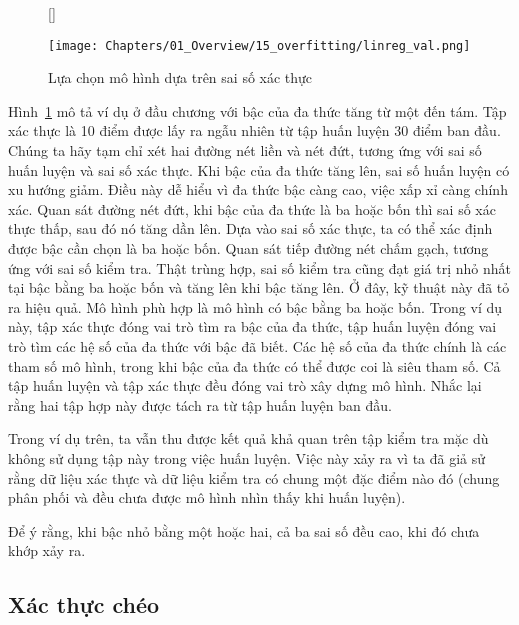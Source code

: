 \begin{figure}[t]
    [\FBwidth]
    {\caption{   
    Lựa chọn mô hình dựa trên sai số xác thực
    }
    \label{fig:15_validerror}}
    { %
    \texttt{[image: Chapters/01\_Overview/15\_overfitting/linreg\_val.png]}
    }
\end{figure}
Hình~\ref{fig:15_validerror} mô tả ví dụ ở đầu chương với bậc của đa thức tăng
từ một đến tám. Tập xác thực là 10 điểm được lấy ra ngẫu nhiên từ tập huấn luyện
30 điểm ban đầu. Chúng ta hãy tạm chỉ xét hai đường nét liền và nét đứt, tương
ứng với {sai số huấn luyện} và {sai số xác thực}. Khi bậc của đa thức tăng lên,
{sai số huấn luyện} có xu hướng giảm. Điều này dễ hiểu vì đa thức bậc càng cao,
việc xấp xỉ càng chính xác. Quan sát đường nét đứt, khi bậc của đa thức là ba
hoặc bốn thì {sai số xác thực} thấp, sau đó nó tăng dần lên. Dựa vào
{sai số xác thực}, ta có thể xác định được bậc cần chọn là ba hoặc bốn. Quan
sát tiếp đường nét chấm gạch, tương ứng với {sai số kiểm tra}. Thật trùng hợp, sai số kiểm tra cũng đạt giá trị nhỏ nhất tại bậc bằng ba hoặc bốn và tăng lên khi bậc
tăng lên. Ở đây, kỹ thuật này đã tỏ ra hiệu quả. Mô hình phù hợp là mô hình có
bậc bằng ba hoặc bốn. Trong ví dụ này, tập xác thực đóng vai trò tìm ra bậc
của đa thức, tập huấn luyện đóng vai trò tìm các hệ số của đa thức
với bậc đã biết. Các hệ số của đa thức chính là các tham số mô hình,
trong khi bậc của đa thức có thể được coi là {siêu tham số}. Cả tập
huấn luyện và tập xác thực đều đóng vai trò xây dựng mô hình. Nhắc lại rằng
hai tập hợp này được tách ra từ tập huấn luyện ban đầu.
 
Trong ví dụ trên, ta vẫn thu được kết quả khả quan trên tập kiểm tra mặc dù không sử dụng tập này trong việc huấn luyện. Việc này xảy ra vì ta đã giả sử rằng dữ liệu xác thực và dữ liệu kiểm tra
có chung một đặc điểm nào đó (chung phân phối và đều chưa được mô hình nhìn thấy
khi huấn luyện). 

Để ý rằng, khi bậc nhỏ bằng một hoặc hai, cả ba sai số đều cao, khi đó chưa khớp xảy ra.
 
 
 
\subsection{Xác thực chéo}
\label{ssec:crosvalid}

